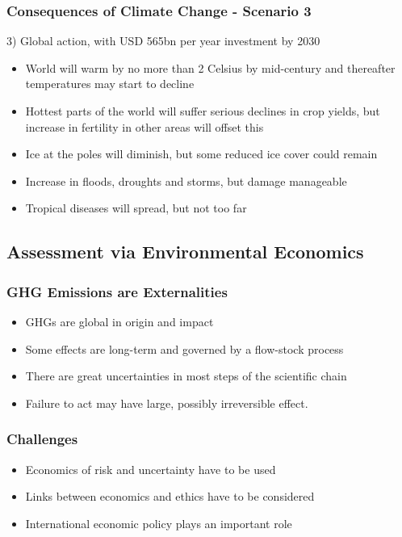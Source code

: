 \begin{frame}
 \frametitle{Consequences of Climate Change - Scenario 3}
3) Global action, with USD 565bn per year investment by 2030
\begin{itemize}
\item<1-> World will warm by no more than 2 Celsius by mid-century and thereafter temperatures may start to decline
\item<2-> Hottest parts of the world will suffer serious declines in crop yields, but increase in fertility in other areas will offset this
\item<3-> Ice at the poles will diminish, but some reduced ice cover could remain
\item<4-> Increase in floods, droughts and storms, but damage manageable
\item<5-> Tropical diseases will spread, but not too far
\end{itemize}
\end{frame} %

\subsection{Assessment via Environmental Economics}

\begin{frame}
\frametitle{GHG Emissions are Externalities}
\begin{itemize}
\item<1-> GHGs are global in origin and impact
\item<2-> Some effects are long-term and governed by a flow-stock process
\item<3-> There are great uncertainties in most steps of the scientific chain
\item<4-> Failure to act may have large, possibly irreversible effect.
\end{itemize}
\end{frame}

\begin{frame}
\frametitle{Challenges}
\begin{itemize}
\item<1-> Economics of risk and uncertainty have to be used
\item<2-> Links between economics and ethics have to be considered
\item<3-> International economic policy plays an important role
\end{itemize}
\end{frame}

